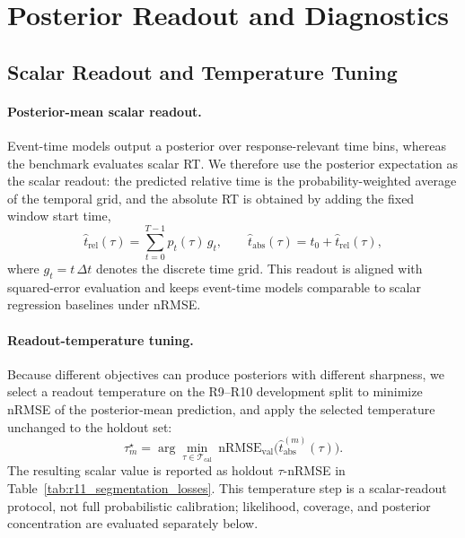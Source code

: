 \documentclass[12pt]{article}
\begin{document}
\section{Posterior Readout and Diagnostics}
\label{sec:posterior_diagnostics}

\subsection{Scalar Readout and Temperature Tuning}

\paragraph{Posterior-mean scalar readout.}
Event-time models output a posterior over response-relevant time bins, whereas the benchmark evaluates scalar RT. We therefore use the posterior expectation as the scalar readout: the predicted relative time is the probability-weighted average of the temporal grid, and the absolute RT is obtained by adding the fixed window start time,
\begin{equation}
\label{eq:rt_soft_argmax}
\hat t_{\mathrm{rel}}(\tau)=\sum_{t=0}^{T-1} p_t(\tau)\, g_t,
\qquad
\hat t_{\mathrm{abs}}(\tau)=t_0+\hat t_{\mathrm{rel}}(\tau),
\end{equation}
where $g_t=t\,\Delta t$ denotes the discrete time grid. This readout is aligned with squared-error evaluation and keeps event-time models comparable to scalar regression baselines under nRMSE.

\paragraph{Readout-temperature tuning.}
Because different objectives can produce posteriors with different sharpness, we select a readout temperature on the R9--R10 development split to minimize nRMSE of the posterior-mean prediction, and apply the selected temperature unchanged to the holdout set:
\begin{equation}
\label{eq:rt_tau_tuning}
\tau_m^\star = \arg\min_{\tau\in\mathcal{T}_{\text{cal}}}
\ \mathrm{nRMSE}_{\text{val}}\big(\hat t_{\mathrm{abs}}^{(m)}(\tau)\big).
\end{equation}
The resulting scalar value is reported as holdout \(\tau\)-nRMSE in Table~\ref{tab:r11_segmentation_losses}. This temperature step is a scalar-readout protocol, not full probabilistic calibration; likelihood, coverage, and posterior concentration are evaluated separately below.
\end{document}

